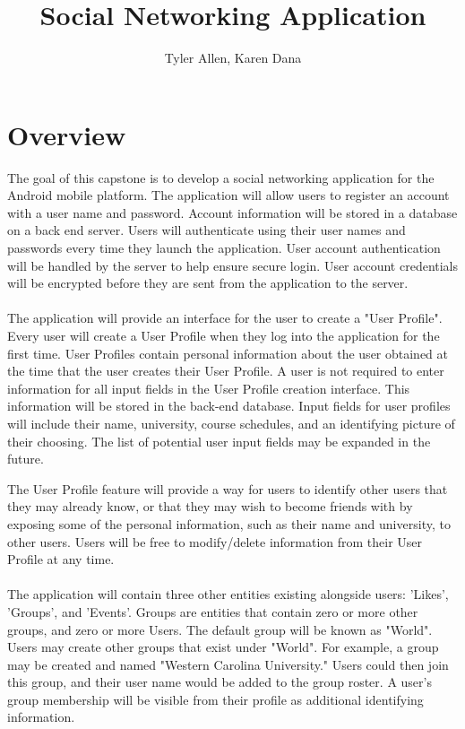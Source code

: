 \documentclass[11pt]{article}
\begin{document}
\title{Social Networking Application} %
\author{Tyler Allen, Karen Dana}
\maketitle

\section{Overview}

The goal of this capstone is to develop a social networking application for 
the Android mobile platform. The application will allow users to register 
an account with a user name and password. Account information will be stored 
in a database on a back end server. Users will authenticate using their user names and 
passwords every time they launch the application. User account authentication 
will be handled by the server to help ensure secure login. User account 
credentials will be encrypted before they are sent from the application to the
server. \\\\

The application will provide an interface for the user to create a 
"User Profile". Every user will create a User Profile when they log into the 
application for the first time. User Profiles contain
personal information about the user obtained at the time that the user creates
their User Profile. A user is not required to enter information
for all input fields in the User Profile creation interface. This information will 
    be stored in the back-end database. Input fields for user profiles will include %
their name, university, course schedules, and an identifying picture of their choosing. The list of 
potential user input fields may be expanded in the future.

The User Profile feature will 
provide a way for users to identify other users that they may already know,
or that they may wish to become friends with by exposing some of the personal
information, such as their name and university, to other users. Users will 
be free to modify/delete information from their User Profile at any time. \\\\

The application will contain three other entities existing alongside users: 
'Likes', 'Groups', and 'Events'. Groups are entities that contain zero or more other 
groups, and zero or more Users. The default group will be known as "World". Users
may create other groups that exist under "World". For example, a group may %
be created and named "Western Carolina University." Users could then join this
group, and their user name would be added to the group roster. A user's group
membership will be visible from their profile as additional identifying 
information.
\end{document}
